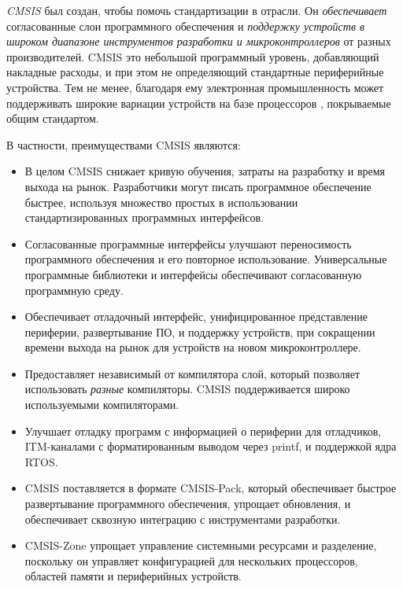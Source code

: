 \clearpage
{}

\emph{CMSIS} был создан, чтобы помочь стандартизации в отрасли. Он
\emph{обеспечивает} согласованные слои программ\-но\-го обеспечения и
\emph{поддержку устройств в широком диапазоне инструментов разработки и
микроконтроллеров} от разных производителей.
CMSIS это небольшой программный уровень, добавляющий накладные расходы, и при
этом не определяющий стандартные периферийные устройства.
Тем не менее, благодаря ему электронная промышленность может поддерживать
широкие вариации устройств на базе процессоров \cm{}, покры\-вае\-мые общим
стандартом.

\medskip
В частности, преимуществами CMSIS являются:
\medskip
\begin{itemize}[nosep]

\item В целом CMSIS снижает кривую обучения, затраты на разработку и время
выхода на рынок. Разработчики могут писать программное обеспечение быстрее,
используя множество простых в использовании стандар\-тизированных программных
интерфейсов.

\item Согласованные программные интерфейсы улучшают переносимость программного
обеспечения и его повторное использование. Универсальные программные библиотеки
и интерфейсы обеспечивают согласо\-ван\-ную программную среду.

\item Обеспечивает отладочный интерфейс, унифицированное представление
периферии, развертывание ПО, и поддержку устройств, при сокращении времени
выхода на рынок для устройств на новом микроконтроллере.

\item Предоставляет независимый от компилятора слой, который позволяет
использовать \textit{разные} компиляторы. CMSIS поддерживается широко
используемыми компиляторами.

\item Улучшает отладку программ с информацией о периферии для отладчиков,
ITM-каналами с форма\-ти\-ро\-ван\-ным выводом через printf, и поддержкой ядра
RTOS.

\item CMSIS поставляется в формате CMSIS-Pack, который обеспечивает быстрое
развертывание программного обеспечения, упрощает обновления, и обеспечивает
сквозную интеграцию с инструментами разработки.

\item CMSIS-Zone упрощает управление системными ресурсами и разделение,
поскольку он управляет конфи\-гу\-ра\-цией для нескольких процессоров, областей
памяти и периферийных устройств.

\end{itemize}